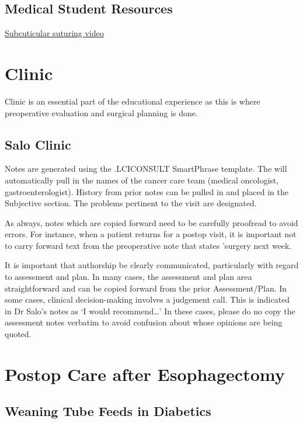 \documentclass[
]{book}
\begin{document}
\hypertarget{medical-student-resources}{%
\section{Medical Student Resources}\label{medical-student-resources}}

\href{https://www.youtube.com/watch?v=M3vISruyFkI}{Subcuticular suturing video}

\hypertarget{clinic-1}{%
\chapter{Clinic}\label{clinic-1}}

Clinic is an essential part of the educational experience as this is where preoperative evaluation and surgical planning is done.

\hypertarget{salo-clinic}{%
\section{Salo Clinic}\label{salo-clinic}}

Notes are generated using the .LCICONSULT SmartPhrase template. The will automatically pull in the names of the cancer care team (medical oncologist, gastroenterologist). History from prior notes can be pulled in and placed in the Subjective section. The problems pertinent to the visit are designated.

As always, notes which are copied forward need to be carefully proofread to avoid errors. For instance, when a patient returns for a postop visit, it is important not to carry forward text from the preoperative note that states 'surgery next week.

It is important that authorship be clearly communicated, particularly with regard to assessment and plan. In many cases, the assessment and plan area straightforward and can be copied forward from the prior Assessment/Plan. In some cases, clinical decision-making involves a judgement call. This is indicated in Dr Salo's notes as `I would recommend\ldots{}' In these cases, please do no copy the assessment notes verbatim to avoid confusion about whose opinions are being quoted.

\hypertarget{mie_postop}{%
\chapter{Postop Care after Esophagectomy}\label{mie_postop}}

\hypertarget{weaning-tube-feeds-in-diabetics}{%
\section{Weaning Tube Feeds in Diabetics}\label{weaning-tube-feeds-in-diabetics}}
\end{document}
